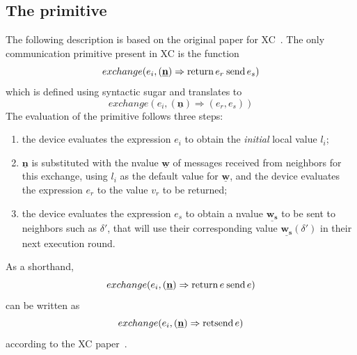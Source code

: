 \subsection{The  primitive}

The following description is based on the original paper for \ac{XC}~\cite{xc}.
%
The only communication primitive present in \ac{XC} is the function $$exchange(e_i, (\underline{\mathbf{n}}) \Rightarrow \mathbf{\operatorname{return\,}} e_r \mathbf{\operatorname{\:send\,}} e_s)$$ which is defined using syntactic sugar and translates to $$exchange(e_i, (\underline{\mathbf{n}}) \Rightarrow (e_r, e_s))$$
%
The evaluation of the primitive follows three steps:
\begin{enumerate}
    \item the device evaluates the expression $e_i$ to obtain the \textit{initial} local value $l_i$;
    \item $\underline{\mathbf{n}}$ is substituted with the nvalue $\underline{\mathbf{w}}$ of messages received from neighbors for this exchange, using $l_i$ as the default value for $\underline{\mathbf{w}}$, and the device evaluates the expression $e_r$ to the value $v_r$ to be returned;
    \item the device evaluates the expression $e_s$ to obtain a nvalue $\underline{\mathbf{w_s}}$ to be sent to neighbors such as $\delta'$, that will use their corresponding value $\underline{\mathbf{w_s}}(\delta')$ in their next execution round.
\end{enumerate}

As a shorthand, $$exchange(e_i, (\underline{\mathbf{n}}) \Rightarrow \mathbf{\operatorname{return\,}} e \mathbf{\operatorname{\:send\,}} e)$$ can be written as $$exchange(e_i, (\underline{\mathbf{n}}) \Rightarrow \mathbf{\operatorname{retsend\,}} e)$$ according to the \ac{XC} paper~\cite{xc}.

